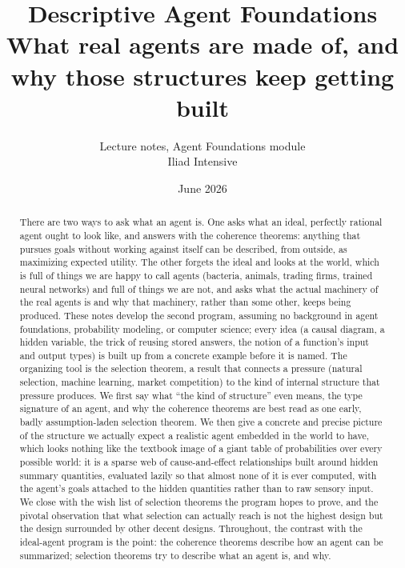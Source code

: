 \documentclass[10pt]{article}
\title{Descriptive Agent Foundations \\[1ex]
{\large What real agents are made of, and why those structures keep getting built}}
\author{Lecture notes, Agent Foundations module \\ Iliad Intensive}
\date{June 2026}
\theoremstyle{definition}
\theoremstyle{remark}
\begin{document}
\maketitle

\begin{abstract}
There are two ways to ask what an agent is. One asks what an ideal, perfectly rational agent ought to look like, and answers with the coherence theorems: anything that pursues goals without working against itself can be described, from outside, as maximizing expected utility. The other forgets the ideal and looks at the world, which is full of things we are happy to call agents (bacteria, animals, trading firms, trained neural networks) and full of things we are not, and asks what the actual machinery of the real agents is and why that machinery, rather than some other, keeps being produced. These notes develop the second program, assuming no background in agent foundations, probability modeling, or computer science; every idea (a causal diagram, a hidden variable, the trick of reusing stored answers, the notion of a function's input and output types) is built up from a concrete example before it is named. The organizing tool is the selection theorem, a result that connects a pressure (natural selection, machine learning, market competition) to the kind of internal structure that pressure produces. We first say what ``the kind of structure'' even means, the type signature of an agent, and why the coherence theorems are best read as one early, badly assumption-laden selection theorem. We then give a concrete and precise picture of the structure we actually expect a realistic agent embedded in the world to have, which looks nothing like the textbook image of a giant table of probabilities over every possible world: it is a sparse web of cause-and-effect relationships built around hidden summary quantities, evaluated lazily so that almost none of it is ever computed, with the agent's goals attached to the hidden quantities rather than to raw sensory input. We close with the wish list of selection theorems the program hopes to prove, and the pivotal observation that what selection can actually reach is not the highest design but the design surrounded by other decent designs. Throughout, the contrast with the ideal-agent program is the point: the coherence theorems describe how an agent can be summarized; selection theorems try to describe what an agent is, and why.
\end{abstract}

\tableofcontents
\end{document}
